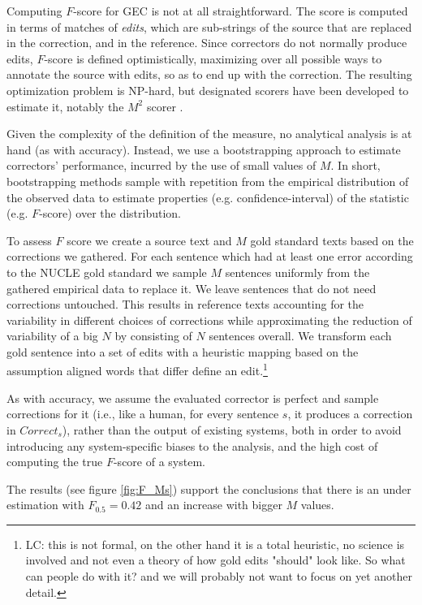 \documentclass[letter,11pt]{article}
\newcommand{\lc}[1]{\footnote{\color{green}LC: #1}}
\begin{document}
		Computing $F$-score for GEC is not at all straightforward. The score is computed
		in terms of matches of {\it edits}, which are sub-strings of the source
		that are replaced in the correction, and in the reference. Since correctors
		do not normally produce edits, $F$-score is defined optimistically, maximizing
		over all possible ways to annotate the source with edits, so as to end up with the correction. 
		The resulting optimization problem is NP-hard, but designated scorers
		have been developed to estimate it, notably the $M^2$ scorer
		\cite{dahlmeier2012better}.
		
		Given the complexity of the definition of the measure, no analytical analysis is at hand (as with accuracy). Instead, we use a bootstrapping
		approach to estimate correctors' performance,
		incurred by the use of small values of $M$.
		In short, bootstrapping methods sample with repetition from the empirical distribution of the observed data to estimate properties (e.g. confidence-interval) of the statistic (e.g. $F$-score) over the distribution. 
		
		To assess $F$ score we create a source text and $M$ gold standard texts based on the corrections we gathered.
		For each sentence which had at least one error according to the NUCLE gold standard we sample $M$ sentences uniformly from the
		gathered empirical data to replace it. We leave sentences that do not need corrections untouched. This results in reference texts accounting for the variability in different choices of corrections while approximating the reduction of variability of a big $N$ by consisting of $N$ sentences overall.
		We transform each gold sentence into a set of edits with a heuristic mapping based on the assumption aligned words that differ define an edit.\lc{this is not formal, on the other hand it is a total heuristic, no science is involved and not even a theory of how gold edits "should" look like. So what can people do with it? and we will probably not want to focus on yet another detail.}
		
		As with accuracy, we assume the evaluated corrector is perfect and sample corrections for it
		(i.e., like a human, for every sentence $s$, it produces a correction in $Correct_s$),
		rather than the output of existing systems, both
		in order to avoid introducing any system-specific biases to the analysis,
		and the high cost of computing the true $F$-score of a system.
		
		The results (see figure \ref{fig:F_Ms}) support the conclusions that there is an under estimation with $F_{0.5} = 0.42$ and an increase with bigger $M$ values.
		
\end{document}
